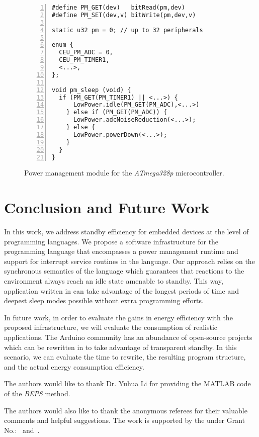 \begin{figure}[t]
\begin{lstlisting}[numbers=left]
#define PM_GET(dev)   bitRead(pm,dev)
#define PM_SET(dev,v) bitWrite(pm,dev,v)

static u32 pm = 0; // up to 32 peripherals

enum {
  CEU_PM_ADC = 0,
  CEU_PM_TIMER1,
  <...>,
};

void pm_sleep (void) {
  if (PM_GET(PM_TIMER1) || <...>) {
      LowPower.idle(PM_GET(PM_ADC),<...>)
    } else if (PM_GET(PM_ADC)) {
      LowPower.adcNoiseReduction(<...>);
    } else {
      LowPower.powerDown(<...>);
    }
  }
}
\end{lstlisting}
\caption{ Power management module for the \emph{ATmega328p} microcontroller.
\label{lst.pm}
}
\end{figure}

\section{Conclusion and Future Work}
\label{sec.conclusion}

In this work, we address standby efficiency for embedded devices at the level
of programming languages.
%
We propose a software infrastructure for the programming language \CEU that
encompasses a power management runtime and support for interrupt service
routines in the language.
%
Our approach relies on the synchronous semantics of the language which
guarantees that reactions to the environment always reach an idle state
amenable to standby.
%
This way, application written in \CEU can take advantage of the longest periods
of time and deepest sleep modes possible without extra programming efforts.

In future work, in order to evaluate the gains in energy efficiency with the
proposed infrastructure, we will evaluate the consumption of realistic
applications.
%
The Arduino community has an abundance of open-source projects which can be
rewritten in \CEU to take advantage of transparent standby.
%
In this scenario, we can evaluate the time to rewrite, the resulting program
structure, and the actual energy consumption efficiency.

\begin{acks}
  The authors would like to thank Dr. Yuhua Li for providing the
  MATLAB code of the \textit{BEPS} method.

  The authors would also like to thank the anonymous referees for
  their valuable comments and helpful suggestions. The work is
  supported by the  under Grant
  No.:~
  and~.

\end{acks}
